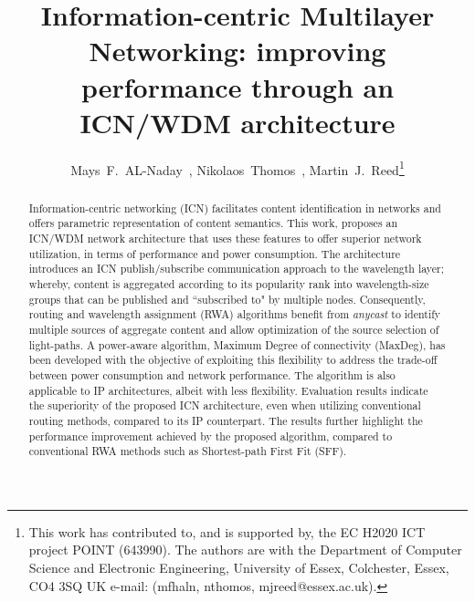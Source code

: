 \documentclass[journal]{IEEEtran}
\begin{document}
\SetEndCharOfAlgoLine{}
\title{Information-centric Multilayer Networking: improving
  performance through an ICN/WDM architecture}


\author{Mays~F.~AL-Naday~,
		Nikolaos~Thomos~, 
    Martin~J.~Reed\thanks{This work has contributed to, and is supported by, the EC H2020 ICT project POINT (643990). The authors are with the Department
of Computer Science and Electronic Engineering, University of Essex, Colchester,
Essex, CO4 3SQ UK e-mail: (mfhaln, nthomos, mjreed@essex.ac.uk).}}
















\maketitle


\begin{abstract}
Information-centric networking (ICN) facilitates content
identification in networks and offers parametric representation of content semantics.
This work, proposes an ICN/WDM network architecture that uses these
features to offer superior network utilization, in terms of
performance and power consumption. The architecture introduces an ICN
publish/subscribe communication approach to the wavelength layer;
whereby, content is aggregated according to its popularity rank into
wavelength-size groups that can be published and ``subscribed to" by
multiple nodes. Consequently, routing and wavelength assignment (RWA) algorithms benefit from
\emph{anycast} to identify multiple sources of
aggregate content and allow optimization of the source selection of
light-paths. A power-aware algorithm, Maximum Degree of connectivity
(MaxDeg), has been developed with the objective of exploiting this
flexibility to address the trade-off between power consumption and
network performance. The algorithm is also applicable to IP architectures, albeit with less flexibility. Evaluation results indicate the superiority of the proposed ICN architecture, even when utilizing conventional routing methods, compared to its IP counterpart. The results further highlight the performance improvement achieved by the proposed algorithm, compared to conventional RWA methods such as Shortest-path First Fit (SFF). 
\end{abstract}
\end{document}
